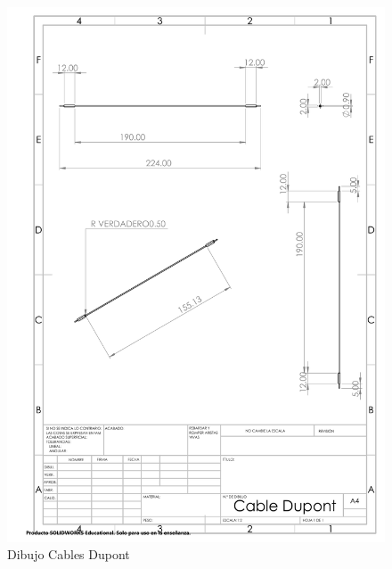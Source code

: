 \begin{figure}[H]
    \centering
    \includegraphics[scale=0.4]{10/Img/cotasDupont.pdf}
    \caption{Dibujo Cables Dupont}
    \label{fig:cotasdupont.png}
\end{figure}

